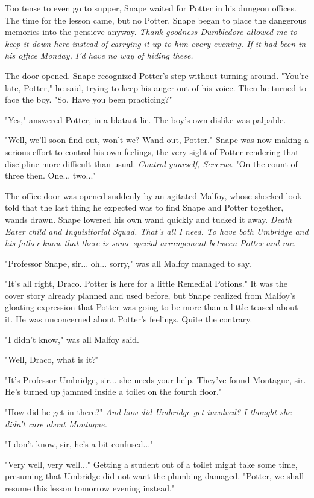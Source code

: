 \documentclass[a4paper,11pt]{article}
\begin{document}
Too tense to even go to supper, Snape waited for Potter in his dungeon offices. The time for the lesson came, but no Potter. Snape began to place the dangerous memories into the pensieve anyway. \emph{Thank goodness Dumbledore allowed me to keep it down here instead of carrying it up to him every evening. If it had been in his office Monday, I'd have no way of hiding these.}

The door opened. Snape recognized Potter's step without turning around. "You're late, Potter," he said, trying to keep his anger out of his voice. Then he turned to face the boy. "So. Have you been practicing?"

"Yes," answered Potter, in a blatant lie. The boy's own dislike was palpable.

"Well, we'll soon find out, won't we? Wand out, Potter." Snape was now making a serious effort to control his own feelings, the very sight of Potter rendering that discipline more difficult than usual. \emph{Control yourself, Severus}. "On the count of three then. One... two..."

The office door was opened suddenly by an agitated Malfoy, whose shocked look told that the last thing he expected was to find Snape and Potter together, wands drawn. Snape lowered his own wand quickly and tucked it away. \emph{Death Eater child and Inquisitorial Squad. That's all I need. To have both Umbridge and his father know that there is some special arrangement between Potter and me.}

"Professor Snape, sir... oh... sorry," was all Malfoy managed to say.

"It's all right, Draco. Potter is here for a little Remedial Potions." It was the cover story already planned and used before, but Snape realized from Malfoy's gloating expression that Potter was going to be more than a little teased about it. He was unconcerned about Potter's feelings. Quite the contrary.

"I didn't know," was all Malfoy said.

"Well, Draco, what is it?"

"It's Professor Umbridge, sir... she needs your help. They've found Montague, sir. He's turned up jammed inside a toilet on the fourth floor."

"How did he get in there?" \emph{And how did Umbridge get involved? I thought she didn't care about Montague.}

"I don't know, sir, he's a bit confused..."

"Very well, very well..." Getting a student out of a toilet might take some time, presuming that Umbridge did not want the plumbing damaged. "Potter, we shall resume this lesson tomorrow evening instead."
\end{document}
